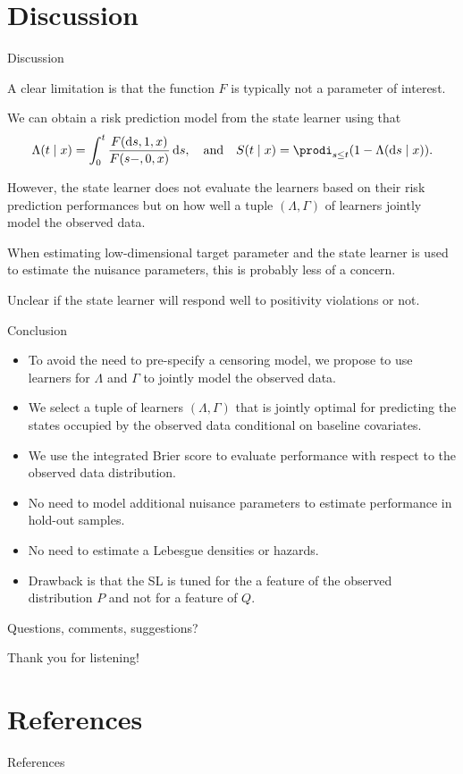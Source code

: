 \documentclass[smaller]{beamer}\usepackage{listings}
\begin{document}
\section{Discussion}
\label{sec:orgf5a60aa}
\begin{frame}[label={sec:org7553441}]{Discussion}
\small

A clear limitation is that the function \(F\) is typically not a parameter of
interest.

\vfill

We can obtain a risk prediction model from the state learner using that
\begin{equation*}
  \Lambda(t \mid x) = \int_0^t \frac{F(\diff s, 1, x)}{F(s-, 0, x)}  \diff s,
  \quad \text{and} \quad
  S(t \mid x)
  = \prodi_{s \leq t}(1- \Lambda(\diff s \mid x)).
\end{equation*}

However, the state learner does not evaluate the learners based on their risk
prediction performances but on how well a tuple \((\Lambda, \Gamma)\) of
learners jointly model the observed data.

\vfill

When estimating low-dimensional target parameter and the state learner is used
to estimate the nuisance parameters, this is probably less of a concern.

\vfill

Unclear if the state learner will respond well to positivity violations or not.
\end{frame}

\begin{frame}[label={sec:org419716e}]{Conclusion}
\small

\begin{itemize}
\item To avoid the need to pre-specify a censoring model, we propose to use learners
for \(\Lambda\) and \(\Gamma\) to jointly model the observed data.
\item We select a tuple of learners \((\Lambda, \Gamma)\) that is jointly optimal
for predicting the states occupied by the observed data conditional on
baseline covariates.
\item We use the integrated Brier score to evaluate performance with
respect to the observed data distribution.
\item No need to model additional nuisance parameters to estimate performance in
hold-out samples.
\item No need to estimate a Lebesgue densities or hazards.
\item Drawback is that the SL is tuned for the a feature of the observed
distribution \(P\) and not for a feature of \(Q\).
\end{itemize}

\vfill


\begin{block}{Questions, comments, suggestions?}
\vfill

\flushright Thank you for listening!
\end{block}
\end{frame}

\section*{References}
\label{sec:orgdbb741e}
\begin{frame}[label={sec:orgeea7d05}]{References}
\tiny 
\end{frame}
\end{document}
